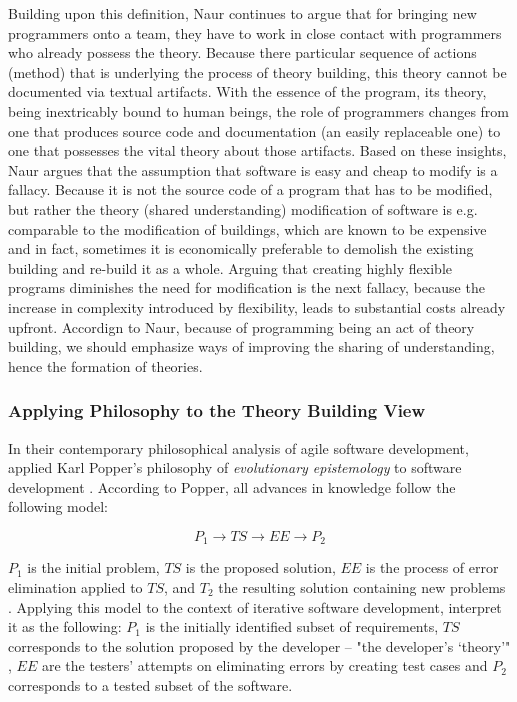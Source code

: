Building upon this definition, Naur continues to argue that for bringing new programmers onto a team, they have to work in close contact with programmers who already possess the theory.
Because there particular sequence of actions (method) that is underlying the process of theory building, this theory cannot be documented via textual artifacts.
With the essence of the program, its theory, being inextricably bound to human beings, the role of programmers changes from one that produces source code and documentation (an easily replaceable one) to one that possesses the vital theory about those artifacts.
Based on these insights, Naur argues that the assumption that software is easy and cheap to modify is a fallacy.
Because it is not the source code of a program that has to be modified, but rather the theory (shared understanding) modification of software is e.g. comparable to the modification of buildings, which are known to be expensive and in fact, sometimes it is economically preferable to demolish the existing building and re-build it as a whole.
Arguing that creating highly flexible programs diminishes the need for modification is the next fallacy, because the increase in complexity introduced by flexibility, leads to substantial costs already upfront.
Accordign to Naur, because of programming being an act of theory building, we should emphasize ways of improving the sharing of understanding, hence the formation of theories.

\subsubsection{Applying Philosophy to the Theory Building View}

In their contemporary philosophical analysis of agile software development, \citeauthor{northover_agile_2007} applied Karl Popper's philosophy of \emph{evolutionary epistemology} to software development \cite{northover_agile_2007}.
According to Popper\addref, all advances in knowledge follow the following model:

\[P_1 \rightarrow TS \rightarrow EE \rightarrow P_2\]

$P_1$ is the initial problem, $TS$ is the proposed solution, $EE$ is the process of error elimination applied to $TS$, and $T_2$ the resulting solution containing new problems \addref.
Applying this model to the context of iterative software development, \citeauthor{northover_agile_2007} interpret it as the following: $P_1$ is the initially identified subset of requirements, $TS$ corresponds to the solution proposed by the developer -- "the developer's `theory'" \cite{northover_agile_2007}, $EE$ are the testers' attempts on eliminating errors by creating test cases and $P_2$ corresponds to a tested subset of the software.

